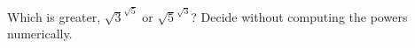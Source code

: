 Which is greater, $\sqrt3^{\sqrt5}$ or $\sqrt5^{\sqrt3}$? Decide without computing the powers numerically.
